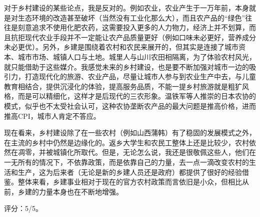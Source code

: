 对于乡村建设的某些论点，我是反对的。例如农业，农业产生于一万年前，本身就是对生态环境的改造甚至破坏（当然没有工业化那么大），而且农产品的“绿色”往往是刻意追求不使用化肥农药，这需要投入更多的人力物力，经济上并不划算，而且抗拒现代农业手段并不一定能让农产品质量更好（例如口味未必更好，营养成分未必更优）。另外，乡建是围绕着农村和农民来展开的，但其实是连接了城市资本、城市市场、城镇人口与土地。城里人与山川农田相隔离，为了体验农村风光，就只能借助于这些媒介。我感觉未来的乡村建设，也是要不断加强对城市一边的吸引力，打造现代化的旅游、农业产品，尽量让城市人参与到农业生产中去，与儿童教育相结合，提供沉浸化的体验，提高服务品质，不能一提乡村旅游就是粗犷风格，而是可以精细化，这样才是后现代的三农形象。温铁军等人推崇的日本农协的模式，似乎也不太受社会认可，这种农协垄断农产品的最大问题是推高价格，进而推高CPI，城市人肯定不答应。

现在看来，乡村建设除了在一些农村（例如山西蒲韩）有了稳固的发展模式之外，在主流的乡村中仍然是边缘化的。返乡大学生和农民工整体上还是比较少，农村依然在凋零，并被城镇化所取代。但是，无论怎么说，我还是很敬佩这些人，他们在一无所有的情况下，不依靠政策，而是依靠自己的力量，去一点一滴改变农村的生活和生产，这为后来者（无论是新的乡建人员还是政府）都提供了很好的经验借鉴。整体来看，乡建事业相对于现在的官方农村政策而言依旧是小众，但相比从前，乡建的力量本身也在不断地增强。

评分：5/5。